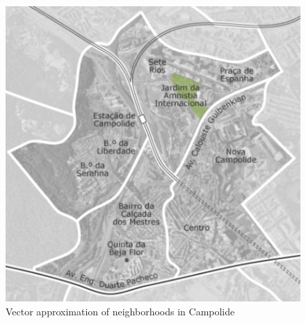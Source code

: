 \begin{figure}[H]
	\centering
	\includegraphics[width=.5\linewidth]{images/neighborhood_definition.png}
	\caption{Vector approximation of neighborhoods in Campolide}
	\label{fig:neighborhood}
\end{figure}

